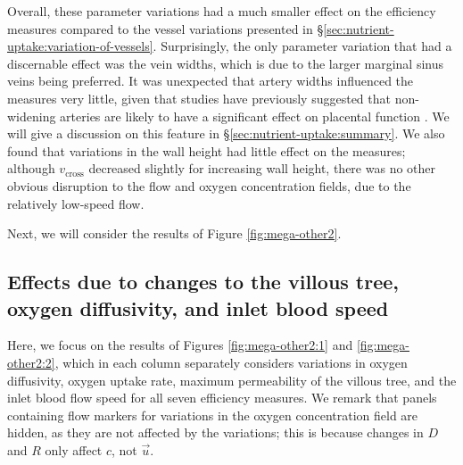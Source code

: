             Overall, these parameter variations had a much smaller effect on the efficiency measures compared to the vessel variations presented in \S\ref{sec:nutrient-uptake:variation-of-vessels}. Surprisingly, the only parameter variation that had a discernable effect was the vein widths, which is due to the larger marginal sinus veins being preferred. It was unexpected that artery widths influenced the measures very little, given that studies have previously suggested that non-widening arteries are likely to have a significant effect on placental function \cite{burtonRheologicalPhysiologicalConsequences2009}. We will give a discussion on this feature in \S\ref{sec:nutrient-uptake:summary}. We also found that variations in the wall height had little effect on the measures; although $v_\text{cross}$ decreased slightly for increasing wall height, there was no other obvious disruption to the flow and oxygen concentration fields, due to the relatively low-speed flow.

            Next, we will consider the results of Figure \ref{fig:mega-other2}.

        \subsection{Effects due to changes to the villous tree, oxygen diffusivity, and inlet blood speed} \label{sec:nutrient-uptake:variation-of-other-parameters:2}
            Here, we focus on the results of Figures \ref{fig:mega-other2:1} and \ref{fig:mega-other2:2}, which in each column separately considers variations in oxygen diffusivity, oxygen uptake rate, maximum permeability of the villous tree, and the inlet blood flow speed for all seven efficiency measures. We remark that panels containing flow markers for variations in the oxygen concentration field are hidden, as they are not affected by the variations; this is because changes in $D$ and $R$ only affect $c$, not $\vec{u}$.

